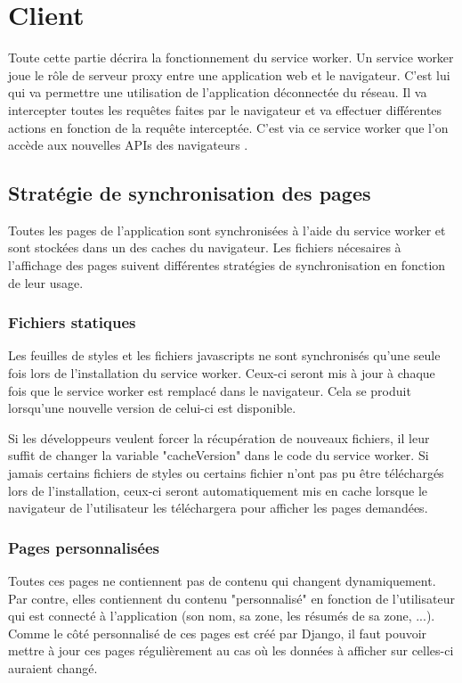 \documentclass{EPL-master-thesis-covers-FR}
\begin{document}
				
		\section{Client}
			Toute cette partie décrira la fonctionnement du service worker. Un service worker joue le rôle de serveur proxy entre une application web et le navigateur. C'est lui qui va permettre une utilisation de l'application déconnectée du réseau. Il va intercepter toutes les requêtes faites par le navigateur et va effectuer différentes actions en fonction de la requête interceptée. C'est via ce service worker que l'on accède aux nouvelles APIs des navigateurs \cite{ref:sw}.
			
			
			\subsection{Stratégie de synchronisation des pages}			
				Toutes les pages de l'application sont synchronisées à l'aide du service worker et sont stockées dans un des caches du navigateur. Les fichiers nécesaires à l'affichage des pages suivent différentes stratégies de synchronisation en fonction de leur usage.			
				
				\subsubsection*{Fichiers statiques}  
					Les feuilles de styles et les fichiers javascripts ne sont synchronisés qu'une seule fois lors de l'installation du service worker. Ceux-ci seront mis à jour à chaque fois que le service worker est remplacé dans le navigateur. Cela se produit lorsqu'une nouvelle version de celui-ci est disponible. 
					
					Si les développeurs veulent forcer la récupération de nouveaux fichiers, il leur suffit de changer la variable "cacheVersion" dans le code du service worker. Si jamais certains fichiers de styles ou certains fichier n'ont pas pu être téléchargés lors de l'installation, ceux-ci seront automatiquement mis en cache lorsque le navigateur de l'utilisateur les téléchargera pour afficher les pages demandées.
					
					
				\subsubsection*{Pages personnalisées}				
				 	Toutes ces pages ne contiennent pas de contenu qui changent dynamiquement. Par contre, elles contiennent du contenu "personnalisé" en fonction de l'utilisateur qui est connecté à l'application (son nom, sa zone, les résumés de sa zone, ...). Comme le côté personnalisé de ces pages est créé par Django, il faut pouvoir mettre à jour ces pages régulièrement au cas où les données à afficher sur celles-ci auraient changé. 
				 	
\end{document}
